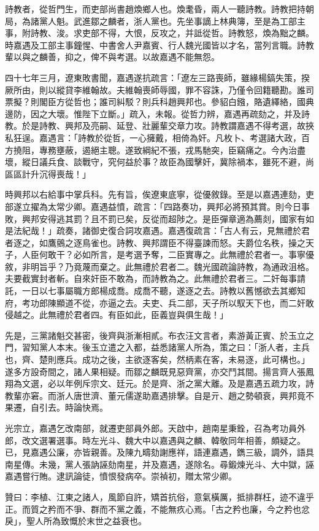 \begin{pinyinscope}
詩教者，從哲門生，而吏部尚書趙煥鄉人也。煥耄昏，兩人一聽詩教。詩教把持朝局，為諸黨人魁。武進鄒之麟者，浙人黨也。先坐事謫上林典簿，至是為工部主事，附詩教、浚。求吏部不得，大恨，反攻之，并詆從哲。詩教怒，煥為黜之麟。時嘉遇及工部主事鐘惺、中書舍人尹嘉賓、行人魏光國皆以才名，當列言職。詩教輩以與之麟善，抑之，俾不與考選。以故嘉遇不能無怨。

四十七年三月，遼東敗書聞，嘉遇遂抗疏言：「遼左三路喪師，雖緣楊鎬失策，揆厥所由，則以縱貸李維翰故。夫維翰喪師辱國，罪不容誅，乃僅令回籍聽勘。誰司票擬？則閣臣方從哲也；誰司糾駁？則兵科趙興邦也。參貂白鏹，賂遺繹絡，國典邊防，因之大壞。惟陛下立斷。」疏入，未報。從哲力辨，嘉遇再疏劾之，并及詩教。於是詩教、興邦及亮嗣、延登、壯麗輩交章力攻。詩教謂嘉遇不得考選，故挾私狂逞。嘉遇言：「詩教於從哲，一心擁戴，相倚為奸。凡枚卜、考選諸大政，百方撓阻，專務壅蔽，遏絕主聰。遂致綱紀不張，戎馬馳突，臣竊痛之。今內治盡壞，縱日議兵食、談戰守，究何益於事？故臣為國擊奸，冀除禍本，雖死不避，尚區區計升沉得喪哉！」

時興邦以右給事中掌兵科。先有旨，俟遼東底寧，從優敘錄。至是以嘉遇連劾，吏部遂立擢為太常少卿。嘉遇益憤，疏言：「四路奏功，興邦必將預其賞。則今日事敗，興邦安得逃其罰？且不罰已矣，反從而超陟之。是臣彈章適為薦剡，國家有如是法紀哉！」疏奏，諸御史復合詞攻嘉遇。嘉遇復疏言：「古人有云，見無禮於君者逐之，如鷹鸇之逐鳥雀也。詩教、興邦謂臣不得臺諫而怒。夫爵位名秩，操之天子，人臣何敢干？必如所言，是考選予奪，二臣實專之。此無禮於君者一。事寧優敘，非明旨乎？乃竟蔑而棄之。此無禮於君者二。魏光國疏論詩教，為通政沮格。夫要截實封者斬。自來奸臣不敢為，而詩教為之。此無禮於君者三。二奸每事請託，一日以七事屬職方郎楊成喬。成喬不聽，遂逐之去。詩教以舊憾欲去其鄉知府，考功郎陳顯道不從，亦逼之去。夫吏、兵二部，天子所以馭天下也，而二奸敢侵越之。此無禮於君者四。有臣如此，臣義豈與俱生哉！」

先是，三黨諸魁交甚密，後齊與浙漸相貳。布衣汪文言者，素游黃正賓、於玉立之門，習知黨人本末。後玉立遣之入都，益悉諸黨人所為，策之曰：「浙人者，主兵也，齊、楚則應兵。成功之後，主欲逐客矣，然柄素在客，未易逐，此可構也。」遂多方設奇間之，諸人果相疑。而鄒之麟既見惡齊黨，亦交鬥其間。揚言齊人張鳳翔為文選，必以年例斥宗文、廷元。於是齊、浙之黨大離。及是嘉遇五疏力攻，詩教輩亦窘。而浙人唐世濟、董元儒遂助嘉遇排擊。自是亓、趙之勢頓衰，興邦竟不果遷，自引去。時論快焉。

光宗立，嘉遇乞改南部，就遷吏部員外郎。天啟中，趙南星秉銓，召為考功員外郎，改文選署選事。時左光斗、魏大中以嘉遇與之麟、韓敬同年相善，頗疑之。已，見嘉遇公廉，亦皆親善。及陳九疇劾謝應祥，語連嘉遇，鐫三級，調外，語具南星傳。未幾，黨人張訥誣劾南星，并及嘉遇，遂除名。尋鍛煉光斗、大中獄，誣嘉遇嘗行賄。逮訊論徒，憤恨發病卒。崇禎初，贈太常少卿。

贊曰：李植、江東之諸人，風節自許，矯首抗俗，意氣橫厲，抵排群枉，迹不違乎正。而質之矜而不爭、群而不黨之義，不能無疚心焉。「古之矜也廉，今之矜也忿戾」，聖人所為致慨於末世之益衰也。


\end{pinyinscope}
